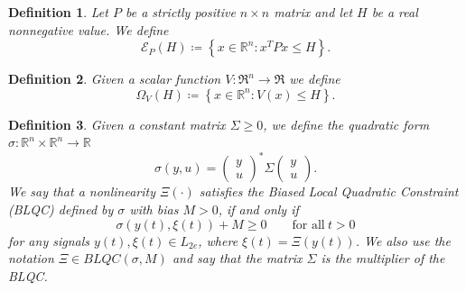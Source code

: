 \documentclass[letterpaper,10pt,twocolumn,journal,final]{IEEEtran}
\newtheorem{dfn}{Definition}
\newcommand{\Csi}{\Xi}
\newcommand{\Real}{\mathbb{R}}
\newcommand{\ellips}{\mathcal{E}}
\begin{document}
\begin{dfn}
	Let $P$ be a strictly positive $n\times n$ matrix and let $H$ be a real nonnegative value. We define
	\begin{equation}\nonumber
		\ellips_P(H)\coloneqq 
			\left\{ 
				x\in \Real^n : x^T P x \leq H
			\right\}.
	\end{equation}
\end{dfn}
\begin{dfn}
	Given a scalar function $V:\Re^n\rightarrow\Re$ we define
	\begin{equation}\nonumber
		\Omega_V(H)\coloneqq 
			\left\{ 
				x\in \Real^n : V(x) \leq H
			\right\}.
	\end{equation}
\end{dfn}


\begin{dfn}
	Given a constant matrix $\Sigma\geq 0$, we define the quadratic form $\sigma: \Real^n \times \Real^n \rightarrow \Real$
		\begin{equation}\nonumber
			\sigma(y,u)=
					\left(\begin{array}{c}
						y\\
						u
					\end{array}\right)^*
					\Sigma
					\left(\begin{array}{c}
						y\\
						u
					\end{array}\right).
		\end{equation}
	We say that a nonlinearity $\Xi(\cdot)$ satisfies the Biased Local Quadratic Constraint (BLQC) defined by $\sigma$ with bias $M>0$, if and only if
	\begin{equation}\label{eq:defLQC}
		\sigma(y(t),\xi(t)) + M\geq 0 \qquad \text{for all}~t>0
	\end{equation}
	for any signals $y(t),\xi(t)\in L_{2e}$, where $\xi(t)=\Xi(y(t))$.
	We also use the notation $\Csi\in BLQC(\sigma,M)$ and say that the matrix $\Sigma$ is the multiplier of the BLQC.
\end{dfn}
\end{document}
